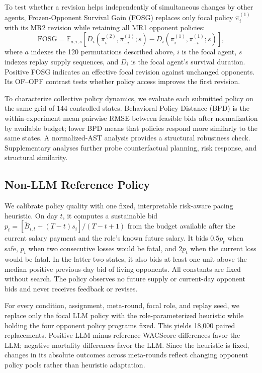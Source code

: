\documentclass[letterpaper]{article} %
\begin{document}
To test whether a revision helps independently of simultaneous changes by
other agents, Frozen-Opponent Survival Gain (FOSG) replaces only focal policy
$\pi_i^{(1)}$ with its MR2 revision while retaining all MR1 opponent policies:
\begin{equation}
    \mathrm{FOSG}
    =
    \mathbb{E}_{a,i,s}\!\left[
        D_i\!\left(\pi_i^{(2)},\pi_{-i}^{(1)};s\right)
        -
        D_i\!\left(\pi_i^{(1)},\pi_{-i}^{(1)};s\right)
    \right],
\end{equation}
where $a$ indexes the 120 permutations described above, $i$ is the focal
agent, $s$ indexes replay supply sequences, and $D_i$ is the focal agent's
survival duration. Positive FOSG indicates an effective focal revision against
unchanged opponents. Its OF--OPF contrast tests whether policy access improves
the first revision.

To characterize collective policy dynamics, we evaluate each submitted
policy on the same grid of 144 controlled states. Behavioral Policy Distance
(BPD) is the within-experiment mean pairwise RMSE between feasible bids after
normalization by available budget; lower BPD means that policies respond more
similarly to the same states. A normalized-AST analysis provides a structural
robustness check. Supplementary analyses further probe counterfactual
planning, risk response, and structural similarity.

\subsection{Non-LLM Reference Policy}

We calibrate policy quality with one fixed, interpretable risk-aware pacing
heuristic. On day $t$, it computes a sustainable bid
$p_t=[\widetilde{B}_{i,t}+(T-t)s_i]/(T-t+1)$ from the budget available after
the current salary payment and the role's known future salary.
It bids $0.5p_t$ when safe, $p_t$ when two consecutive losses would be fatal,
and $2p_t$ when the current loss would be fatal. In the latter two states, it
also bids at least one unit above the median positive previous-day bid of
living opponents. All constants are fixed without search. The policy observes
no future supply or current-day opponent bids and never receives feedback or
revises.

For every condition, assignment, meta-round, focal role, and replay seed, we
replace only the focal LLM policy with the role-parameterized heuristic while
holding the four opponent policy programs fixed. This yields 18,000 paired
replacements. Positive LLM-minus-reference WACScore differences favor the LLM;
negative mortality differences favor the LLM. Since the heuristic is fixed,
changes in its absolute outcomes across meta-rounds reflect changing opponent
policy pools rather than heuristic adaptation.
\end{document}
